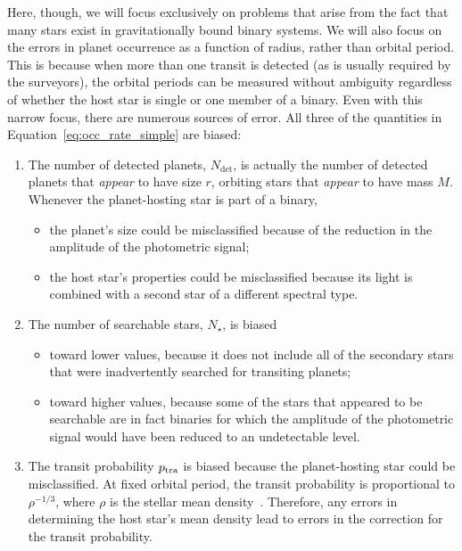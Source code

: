 \documentclass[12pt,modern]{aastex61}
\begin{document}
Here, though, we will focus exclusively on problems that arise from
the fact that many stars exist in gravitationally bound binary
systems.  We will also focus on the errors in planet occurrence as a
function of radius, rather than orbital period. This is because when
more than one transit is detected (as is usually required by the
surveyors), the orbital periods can be measured without ambiguity
regardless of whether the host star is single or one member of a
binary.  Even with this narrow focus, there are numerous sources of
error.  All three of the quantities in
Equation~\ref{eq:occ_rate_simple} are biased:
\begin{enumerate}
%    
    \item The number of detected planets, $N_{\det}$, is actually the
      number of detected planets that {\it appear} to have size $r$,
      orbiting stars that {\it appear} to have mass $M$.  Whenever the
      planet-hosting star is part of a binary,
%    
    \begin{itemize}
        \item the planet's size could be misclassified because of the
          reduction in the amplitude of the photometric signal;
%        
        \item the host star's properties could be misclassified
          because its light is combined with a second star of a
          different spectral type.
%        
    \end{itemize}
%    
    \item The number of searchable stars, $N_\star$, is biased
%    
    \begin{itemize}
%        
        \item toward lower values, because it does not include all of
          the secondary stars that were inadvertently searched for
          transiting planets;
%        
        \item toward higher values, because some of the stars that
          appeared to be searchable are in fact binaries for which the
          amplitude of the photometric signal would have been reduced
          to an undetectable level.
%        
    \end{itemize}
%    
    \item The transit probability $p_{\rm tra}$ is biased because the
      planet-hosting star could be misclassified.  At fixed orbital
      period, the transit probability is proportional to
      $\rho^{-1/3}$, where $\rho$ is the stellar mean
      density~\citep{Winn2010}.  Therefore, any errors in determining
      the host star's mean density lead to errors in the correction
      for the transit probability.
%    
\end{enumerate}
\end{document}
